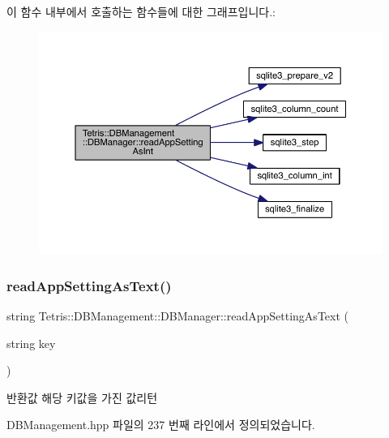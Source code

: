 이 함수 내부에서 호출하는 함수들에 대한 그래프입니다.\+:
\nopagebreak
\begin{figure}[H]
\begin{center}
\leavevmode
\includegraphics[width=350pt]{da/d79/class_tetris_1_1_d_b_management_1_1_d_b_manager_ac52daf6ea2310b848278454c30698436_cgraph}
\end{center}
\end{figure}
\mbox{\label{class_tetris_1_1_d_b_management_1_1_d_b_manager_acb213c517f06d1eadafd45a86b91c2ff}} 
\subsubsection{\texorpdfstring{read\+App\+Setting\+As\+Text()}{readAppSettingAsText()}}
{\footnotesize\ttfamily string Tetris\+::\+D\+B\+Management\+::\+D\+B\+Manager\+::read\+App\+Setting\+As\+Text (\begin{DoxyParamCaption}\item[{string}]{key }\end{DoxyParamCaption})\hspace{0.3cm}{\ttfamily [inline]}}

\begin{DoxyReturn}{반환값}
해당 키값을 가진 값리턴 
\end{DoxyReturn}


D\+B\+Management.\+hpp 파일의 237 번째 라인에서 정의되었습니다.


